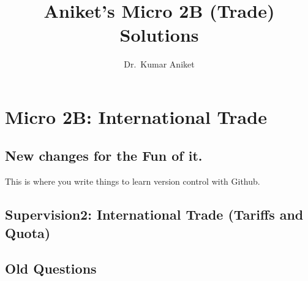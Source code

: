 \documentclass[11pt,reqno]{amsbook}
\title{Aniket's Micro 2B (Trade) Solutions}
\author{Dr.~Kumar Aniket}
\begin{document}



 \frontmatter
 \maketitle
 \tableofcontents
 \mainmatter


\part{Micro 2B: International Trade}
%


% 


\chapter*{New changes for the Fun of it.}

This is where you write things to learn version control with Github. 

\chapter*{Supervision2: International Trade (Tariffs and Quota)}





\chapter*{Old Questions}









\newpage

\backmatter
%
%
\printindex




 
 
\end{document}
